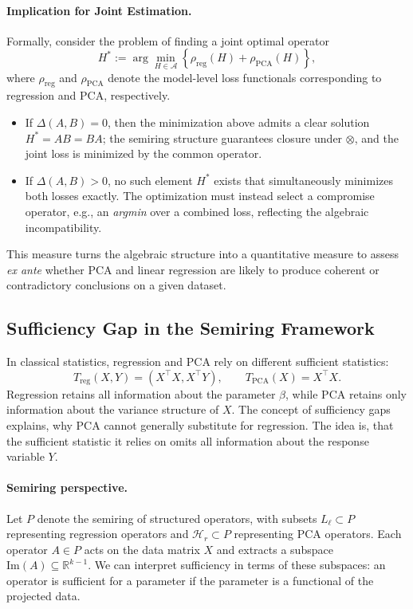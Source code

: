 \paragraph{Implication for Joint Estimation.}
Formally, consider the problem of finding a joint optimal operator
\[
H^* := \arg\min_{H \in \mathcal{A}} \left\{ \rho_\mathrm{reg}(H) + \rho_\mathrm{PCA}(H) \right\},
\]
where $\rho_\mathrm{reg}$ and $\rho_\mathrm{PCA}$ denote the model-level loss functionals corresponding to regression and PCA, respectively. 
\begin{itemize}
    \item If $\Delta(A,B) = 0$, then the minimization above admits a clear solution 
          $H^* = AB = BA$; the semiring structure guarantees closure under $\otimes$, and the joint loss is minimized by the common operator.
    \item If $\Delta(A,B) > 0$, no such element $H^*$ exists that simultaneously minimizes both losses exactly. 
          The optimization must instead select a compromise operator, e.g., an \emph{argmin} over a combined loss, reflecting the algebraic incompatibility.
\end{itemize}

This measure turns the algebraic structure into a quantitative measure to assess \emph{ex ante} whether PCA and linear regression are likely to produce coherent or contradictory conclusions on a given dataset. 

\subsection{Sufficiency Gap in the Semiring Framework}

In classical statistics, regression and PCA rely on different sufficient statistics:
\[
T_{\text{reg}}(X,Y) = (X^\top X, X^\top Y), \qquad
T_{\text{PCA}}(X) = X^\top X.
\]
Regression retains all information about the parameter $\beta$, while PCA retains only information about the variance structure of $X$. The concept of sufficiency gaps explains, why PCA cannot generally substitute for regression. The idea is, that the sufficient statistic it relies on omits all information about the response variable $Y$. 

\paragraph{Semiring perspective.}  
Let $P$ denote the semiring of structured operators, with subsets
$L_\ell \subset P$ representing regression operators and
$\mathcal{H}_r \subset P$ representing PCA operators. 
Each operator $A \in P$ acts on the data matrix $X$ and extracts a subspace
\(\mathrm{Im}(A) \subseteq \mathbb{R}^{k-1}\). 
We can interpret sufficiency in terms of these subspaces: an operator is sufficient for a parameter if the parameter is a functional of the projected data.

